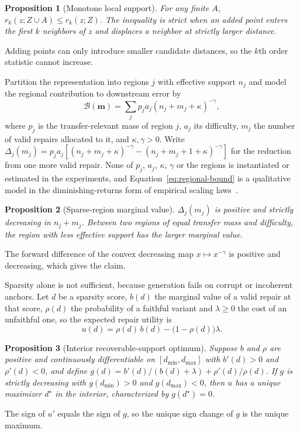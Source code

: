 \documentclass{article}
\newtheorem{proposition}{Proposition}
\begin{document}
\begin{proposition}[Monotone local support]
\label{prop:local-support}
For any finite $A$, $r_k(z;Z\cup A)\leq r_k(z;Z)$. The inequality is strict when an added point enters the first $k$ neighbors of $z$ and displaces a neighbor at strictly larger distance.
\end{proposition}
Adding points can only introduce smaller candidate distances, so the $k$th order statistic cannot increase.

Partition the representation into regions $j$ with effective support $n_j$ and model the regional contribution to downstream error by
\begin{equation}
\mathcal B(\mathbf m)=\sum_j p_j a_j(n_j+m_j+\kappa)^{-\gamma},
\label{eq:regional-bound}
\end{equation}
where $p_j$ is the transfer-relevant mass of region $j$, $a_j$ its difficulty, $m_j$ the number of valid repairs allocated to it, and $\kappa,\gamma>0$. Write $\Delta_j(m_j)=p_ja_j[(n_j+m_j+\kappa)^{-\gamma}-(n_j+m_j+1+\kappa)^{-\gamma}]$ for the reduction from one more valid repair. None of $p_j$, $a_j$, $\kappa$, $\gamma$ or the regions is instantiated or estimated in the experiments, and Equation~\ref{eq:regional-bound} is a qualitative model in the diminishing-returns form of empirical scaling laws~\citep{sorscher2022beyond}.

\begin{proposition}[Sparse-region marginal value]
\label{prop:sparse-value}
$\Delta_j(m_j)$ is positive and strictly decreasing in $n_j+m_j$. Between two regions of equal transfer mass and difficulty, the region with less effective support has the larger marginal value.
\end{proposition}
The forward difference of the convex decreasing map $x\mapsto x^{-\gamma}$ is positive and decreasing, which gives the claim.

Sparsity alone is not sufficient, because generation fails on corrupt or incoherent anchors. Let $d$ be a sparsity score, $b(d)$ the marginal value of a valid repair at that score, $\rho(d)$ the probability of a faithful variant and $\lambda\geq0$ the cost of an unfaithful one, so the expected repair utility is
\begin{equation}
u(d)=\rho(d)\,b(d)-\bigl(1-\rho(d)\bigr)\lambda.
\label{eq:repair-utility}
\end{equation}

\begin{proposition}[Interior recoverable-support optimum]
\label{prop:interior}
Suppose $b$ and $\rho$ are positive and continuously differentiable on $[d_{\min},d_{\max}]$ with $b'(d)>0$ and $\rho'(d)<0$, and define $g(d)=b'(d)/(b(d)+\lambda)+\rho'(d)/\rho(d)$. If $g$ is strictly decreasing with $g(d_{\min})>0$ and $g(d_{\max})<0$, then $u$ has a unique maximizer $d^\star$ in the interior, characterized by $g(d^\star)=0$.
\end{proposition}
The sign of $u'$ equals the sign of $g$, so the unique sign change of $g$ is the unique maximum.
\end{document}
